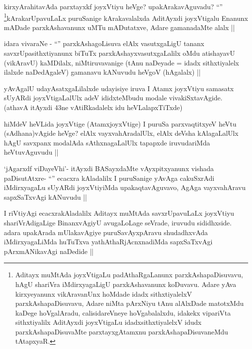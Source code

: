 \begin{artha}
kirxyArahitavAda parxtayxkf joyxVtiyu heVge? upakArakavAguvadu? ``\stext'' \footnote[1]{Aditayx muMtAda joyxVtigaLu padAthaRgaLanunx parxkAshapaDisuvavu, hAgU shariVra iMdirxyagaLigU parxkAshavanunx koDuvavu. Adare yAva kirxyeyanunx vikAravanUnx hoMdade idadx sithxtiyalelxV parxkAshapaDisuvavu, Adare niMta pArxNiyu tAnu alAlxDade matotxMdu kaDege hoVgalAradu, calisidareVneye hoVgabalalxdu, idakekx vipariVta sithxtiyalilx  AditAyxdi joyxVtigaLu idadxsithxtiyalelxV idudx parxkAshapaDisuvaMte parxtayxgAtamxnu parxkAshapaDisuvaneMdu tAtapxyaR.}kArakarUpavuLaLx puruSanige kArakavalalxda AditAyxdi joyxVtigalu Enanunx mADade parxkAshavanunx uMTu mADutatxve, Adare gamanadaMte alalx ||
\end{artha}

\begin{artha}
idara vivaraNe - ``\stext'' parxkAshagoLisuva elAlx vasutxgaLigU tananx savxrUpasithxtiyanunx biTuTx parxkAshayxvasutxgaLalilx oMdu atishayavU (vikAravU) kaMDilalx, niMtiruvavanige (tAnu naDeyade = idadx sithxtiyalelx ilalxde naDedAgaleV) gamanavu kANuvudu heVgoV (hAgalalx) ||
\end{artha}

\begin{artha}
yAvAgalU udayAsatxgaLilalxde udayisiye iruva I Atamx joyxVtiyu samasatx sUyARdi joyxVtigaLalUlx adeV ididxteMbudu modale vivakiSxtavAgide. (athavA itAyxdi 43ne vAtiRkadalelx idu heVLalapxTiTxde)
\end{artha}

\begin{artha}
hiMdeV heVLida joyxVtige (AtamxjoyxVtige) I puruSa parxvaqtitxyeV heVtu (sAdhana)vAgide heVge? elAlx vayxvahAradalUlx, elAlx deVsha kAlagaLalUlx hAgU savxpanx modalAda sAthxnagaLalUlx tapapxde iruvudariMda heVtuvAguvudu ||
\end{artha}

\begin{artha}
`jAgarxdf viDayeVhi'- itAyxdi BASayxdaMte vAyxpitxyanunx vishada paDisutAtxre- ``\stext'' ecacxra kAladalilx I puruSanige yAvAga cakuSxrAdi iMdirxyagaLu sUyARdi joyxVtiyiMda upakaqtavAguvavo, AgAga vayxvahAravu sapxSaTxvAgi kANuvudu ||
\end{artha}

\begin{artha}
I riVtiyAgi ecacxrakAladalilx Aditayx muMtAda savxrUpavuLaLx joyxVtiyu shariVrAdigaLige BinanxvAgiyU avugaLoLage seVrade, iruvudu sididhxside. adara upakArada mUlakavAgiye puruSavAyxpAravu shudadhxvAda iMdirxyagaLiMda huTuTxva yathAthaRjAcnxnadiMda sapxSaTxvAgi pArxmANikavAgi naDedide ||
\end{artha}


